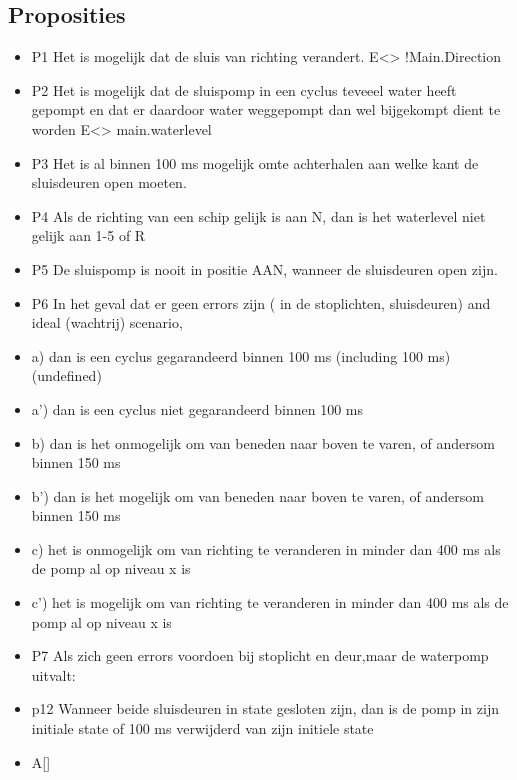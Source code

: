 \documentclass{article}
\begin{document}
	\subsection{Proposities}
	
	\begin{itemize}
		\item  P1 Het is mogelijk dat de sluis van richting verandert.
		E<> !Main.Direction
		\item  P2 Het is mogelijk dat de sluispomp in een cyclus teveeel water heeft gepompt en dat er daardoor water weggepompt dan wel bijgekompt dient te worden
		E<> main.waterlevel
		\item  P3 Het is al binnen 100 ms mogelijk omte achterhalen aan welke kant de sluisdeuren  open moeten.
		\item  P4 Als de richting van een schip gelijk is aan N, dan is het waterlevel niet gelijk aan 1-5 of R
		\item  P5 De sluispomp is nooit in positie AAN, wanneer de sluisdeuren open zijn.
		\item  P6 In het geval dat er geen errors zijn (  in de stoplichten, sluisdeuren) and ideal (wachtrij) scenario,
		\item  a) dan is een cyclus gegarandeerd binnen 100 ms (including 100 ms) (undefined)
		\item  a') dan is een cyclus niet gegarandeerd binnen 100 ms
		\item  b)  dan is het onmogelijk om van beneden naar boven te varen, of andersom binnen 150 ms
		\item  b') dan is het mogelijk om van beneden naar boven te varen, of andersom binnen 150 ms
		\item  c) het is onmogelijk om van richting te veranderen in minder dan 400 ms als de pomp al op niveau x is
		\item  c') het is mogelijk om van richting te veranderen in minder dan 400 ms als de pomp al op niveau x is
		\item  P7 Als zich geen errors voordoen bij stoplicht en deur,maar de waterpomp uitvalt:
 
 
		
		
 
		\item  p12 Wanneer beide sluisdeuren in state gesloten zijn, dan is de pomp in zijn initiale state of 100 ms verwijderd van zijn initiele state
		\item  A[]
 

\end{itemize}
\end{document}
